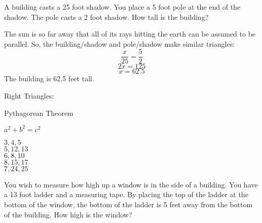 \documentclass[letterpaper,12pt,fleqn]{article}
\renewcommand{\o}{\theta}
\begin{document}
A building casts a 25 foot shadow. You place a 5 foot pole at the end of the
shadow. The pole casts a 2 foot shadow. How tall is the building?

\begin{minipage}[t]{3in}
\end{minipage}
\begin{minipage}[t]{3in}
\end{minipage}

The sun is so far away that all of its rays hitting the earth can be assumed
to be parallel. So, the building/shadow and pole/shadow make similar triangles:
\[\frac{x}{25}=\frac{5}{2}\]
\[2x=125\]
\[x=62.5\]
The building is 62.5 feet tall.

\bigskip

Right Triangles:

Pythagorean Theorem

\begin{minipage}{3in}
\end{minipage}
\begin{minipage}{3in}
  $a^2+b^2=c^2$

  $3,4,5$ \\
  $5,12,13$ \\
  $6,8,10$ \\
  $8,15,17$ \\
  $7,24,25$
\end{minipage}

You wish to measure how high up a window is in the side of a building. You
have a 13 foot ladder and a measuring tape. By placing the top of the ladder
at the bottom of the window, the bottom of the ladder is 5 feet away from the
bottom of the building. How high is the window?
\end{document}
